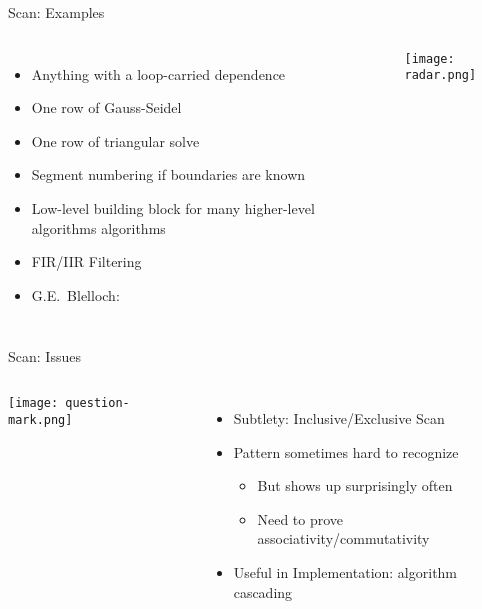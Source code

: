 \documentclass[english,compress]{beamer}
\begin{document}
\begin{frame}{Scan: Examples}
  \begin{columns}
      \begin{itemize}
        \item Anything with a loop-carried dependence
        \item One row of Gauss-Seidel
        \item One row of triangular solve
        \item Segment numbering if boundaries are known
        \item Low-level building block for many higher-level algorithms
        algorithms
        \item FIR/IIR Filtering
        \item G.E.~Blelloch:
      \end{itemize}

      \texttt{[image: radar.png]}
  \end{columns}
\end{frame}
\begin{frame}{Scan: Issues}
  \begin{columns}
      \texttt{[image: question-mark.png]}
      \begin{itemize}
        \item Subtlety: Inclusive/Exclusive Scan
        \item Pattern sometimes hard to recognize
          \begin{itemize}
            \item But shows up surprisingly often
            \item Need to prove associativity/commutativity
          \end{itemize}
        \item Useful in Implementation: algorithm cascading
      \end{itemize}
  \end{columns}
\end{frame}
\end{document}
